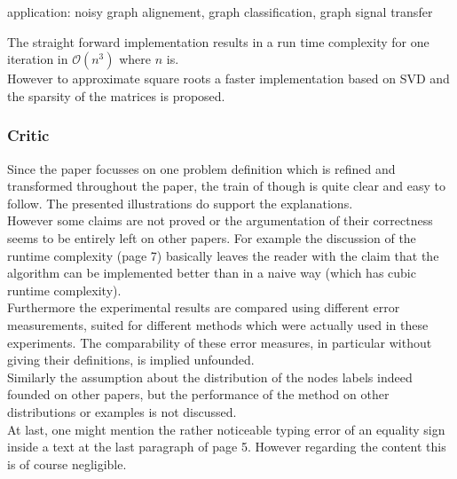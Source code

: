 \documentclass[twoside]{scrartcl}
\begin{document}
application: noisy graph alignement, graph classification, graph signal transfer


The straight forward implementation results in a run time complexity for one iteration in $\mathcal{O}(n^3)$ where $n$ is.\\ %
However to approximate square roots a faster implementation based on SVD and the sparsity of the matrices is proposed.  %


\subsubsection{Critic}
Since the paper focusses on one problem definition which is refined and transformed throughout the paper, the train of though is quite clear and easy to follow. The presented illustrations do support the explanations.\\

However some claims are not proved or the argumentation of their correctness seems to be entirely left on other papers. For example the discussion of the runtime complexity (page 7) basically leaves the reader with the claim that the algorithm can be implemented better than in a naive way (which has cubic runtime complexity).\\

Furthermore the experimental results are compared using different error measurements, suited for different methods which were actually used in these experiments. The comparability of these error measures, in particular without giving their definitions, is implied unfounded.\\
Similarly the assumption about the distribution of the nodes labels indeed founded on other papers, but the performance of the method on other distributions or examples is not discussed.\\

At last, one might mention the rather noticeable typing error of an equality sign inside a text at the last paragraph of page 5. However regarding the content this is of course negligible.
\end{document}
